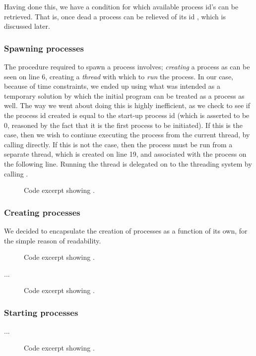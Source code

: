 Having done this, we have a condition for which available process id's can be
retrieved. That is, once dead a process can be relieved of its id
, which is discussed later.

\subsubsection{Spawning processes}
The procedure required to spawn a process involves; {\it creating} a process
 as can be seen on line 6, creating a
{\it thread} with which to {\it run} the process. In our case, because of time
constraints, we ended up using what was intended as a temporary solution by
which the initial program can be treated as a process as well. The way we went
about doing this is highly inefficient, as we check to see if the process id
created is equal to the start-up process id (which is asserted to be 0,
reasoned by the fact that it is the first process to be initiated). If this is
the case, then we wish to continue executing the process from the current
thread, by calling  directly. If this is not the case,
then the process must be run from a separate thread, which is created on line
19, and associated with the process on the following line. Running the thread
is delegated on to the threading system by calling .
\begin{figure}[H]
    
    \caption{Code excerpt showing .}
    \label{code:process_spawn}
\end{figure}

\subsubsection{Creating processes}
We decided to encapsulate the creation of processes as a function of its own,
for the simple reason of readability.
\begin{figure}[H]
    
    \caption{Code excerpt showing .}
    \label{code:process_create_process}
\end{figure}
...
\begin{figure}[H]
    
    \caption{Code excerpt showing .}
    \label{code:process_get_available_pid}
\end{figure}

\subsubsection{Starting processes}
...
\begin{figure}[H]
    
    \vspace{-0.25in}\center{\dots}
    
    \vspace{-0.25in}\center{\dots}
    
    \caption{Code excerpt showing .}
    \label{code:process_start}
\end{figure}
